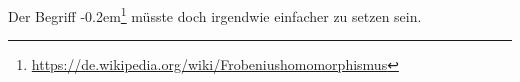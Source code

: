 
Der Begriff \frob\kern-0.2em\footnote{\url{https://de.wikipedia.org/wiki/Frobeniushomomorphismus}} müsste doch irgendwie einfacher zu setzen sein.

